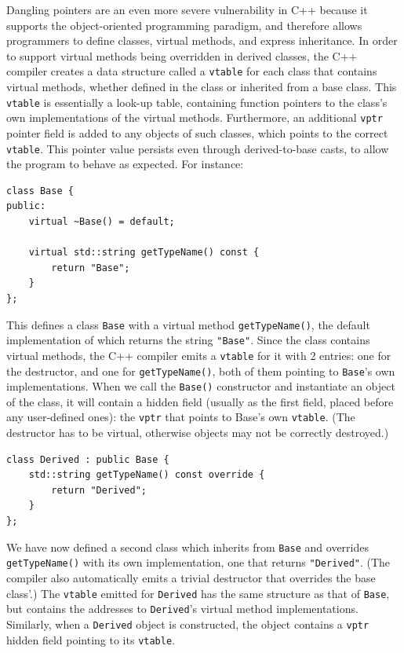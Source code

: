 Dangling pointers are an even more severe vulnerability in C++ because it supports the object-oriented programming paradigm, and therefore allows programmers to define classes, virtual methods, and express inheritance. In order to support virtual methods being overridden in derived classes, the C++ compiler creates a data structure called a \texttt{vtable} for each class that contains virtual methods, whether defined in the class or inherited from a base class. This \texttt{vtable} is essentially a look-up table, containing function pointers to the class's own implementations of the virtual methods. Furthermore, an additional \texttt{vptr} pointer field is added to any objects of such classes, which points to the correct \texttt{vtable}. This pointer value persists even through derived-to-base casts, to allow the program to behave as expected. For instance:

\begin{lstlisting}
class Base {
public:
	virtual ~Base() = default;

	virtual std::string getTypeName() const {
		return "Base";
	}
};
\end{lstlisting}

This defines a class \texttt{Base} with a virtual method \lstinline!getTypeName()!, the default implementation of which returns the string \lstinline!"Base"!. Since the class contains virtual methods, the C++ compiler emits a \texttt{vtable} for it with 2 entries: one for the destructor, and one for \lstinline!getTypeName()!, both of them pointing to \lstinline!Base!'s own implementations. When we call the \lstinline!Base()! constructor and instantiate an object of the class, it will contain a hidden field (usually as the first field, placed before any user-defined ones): the \texttt{vptr} that points to Base's own \texttt{vtable}. (The destructor has to be virtual, otherwise objects may not be correctly destroyed.)

\begin{lstlisting}
class Derived : public Base {
	std::string getTypeName() const override {
		return "Derived";
	}
};
\end{lstlisting}

We have now defined a second class which inherits from \lstinline!Base! and overrides \lstinline!getTypeName()! with its own implementation, one that returns \lstinline!"Derived"!. (The compiler also automatically emits a trivial destructor that overrides the base class'.) The \texttt{vtable} emitted for \lstinline!Derived! has the same structure as that of \lstinline!Base!, but contains the addresses to \lstinline!Derived!'s virtual method implementations. Similarly, when a \lstinline!Derived! object is constructed, the object contains a \texttt{vptr} hidden field pointing to its \texttt{vtable}.

